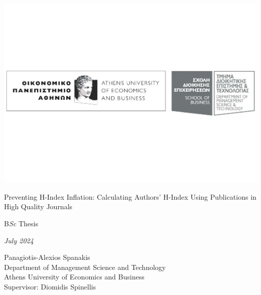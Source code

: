 
\centering
\includegraphics[width=\textwidth]{../figs/aueb_logo.pdf}

{\Large Preventing H-Index Inflation: Calculating Authors’ H-Index Using Publications in High Quality Journals \par}
\vspace{3cm}
{B\emph{Sc} Thesis}

\vspace{2cm}
{\emph{July 2024}}

\vspace{2.5cm}


Panagiotis-Alexios Spanakis \\ Department of Management Science and Technology
\\ Athens University of Economics and Business \\ Supervisor: Diomidis
Spinellis
